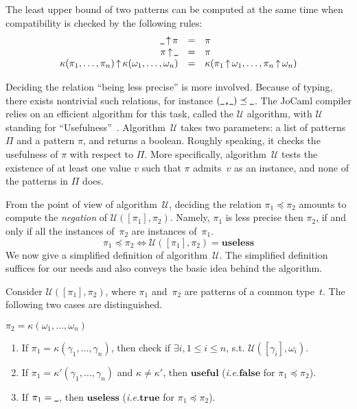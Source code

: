 \documentclass{LMCS}
\makeatletter
\newcommand{\pair}[2]{#1\mathord{\texttt{,}}#2}
\newcommand{\const}{\kappa}
\newcommand{\pt}{\pi}
\newcommand{\ptbis}{\omega}
\newcommand{\pts}{\Pi}
\newcommand{\lessprecise}{\preceq}
\newcommand{\ie}{\emph{i.e.}\@\xspace}
\newcommand{\jocaml}{\textrm{JoCaml}\xspace}
\newcommand{\kwd}[1]{\ensuremath{\mathbf{#1}}}
\newcommand{\lubop}{\mathop{\uparrow}}
\newcommand{\lub}[2]{#1 \lubop #2}
\renewcommand{\_}{\mathord{\rule[-.25ex]{1ex}{.15ex}}}
\makeatother
\begin{document}
The least upper bound of two patterns can be computed at the same time
when compatibility is checked by the following rules: $$
\begin{array}{rcllrcl}
\lub{\_}{\pt} & = & \pt \\
\lub{\pt}{\_} & = & \pt \\
\lub{\const(\pt_1,\ldots,\pt_n)}{\const(\ptbis_1,\ldots,\ptbis_n)} & = &
\const(\lub{\pt_1}{\ptbis_1}, \ldots, \lub{\pt_n}{\ptbis_n})
\end{array}
$$

Deciding the relation ``being less precise'' is more involved. Because
of typing, there exists nontrivial such relations, for instance
$(\pair{\_}{\_}) \lessprecise \_$.  The \jocaml compiler relies on an
efficient algorithm for this task, called the $\mathcal{U}$ algorithm,
with $\mathcal{U}$ standing for ``Usefulness''~\cite{warning}.
Algorithm~$\mathcal{U}$ takes two parameters: a list of patterns
$\pts$ and a pattern $\pt$, and returns a boolean. Roughly speaking, it
checks the usefulness of $\pt$ with respect to $\pts$. More
specifically, algorithm~$\mathcal{U}$ tests the existence of at least
one value $v$ such that $\pt$ admits~$v$ as an instance, and none of
the patterns in $\pts$ does.

From the point of view of algorithm~$\mathcal{U}$, deciding
the relation $\pt_1\lessprecise\pt_2$ amounts
to compute the \emph{negation} of $\mathcal{U}([\pt_1],\pt_2)$.
Namely, $\pt_1$ is less precise then $\pt_2$, if and only if
all the instances of~$\pt_2$ are instances of~$\pt_1$.
$$\pt_1\lessprecise\pt_2 \iff \mathcal{U}([\pt_1],\pt_2) = \kwd{useless}$$
We now give a simplified definition of algorithm~$\mathcal{U}$.
The simplified definition suffices for our needs and also conveys the
basic idea behind the algorithm.

Consider $\mathcal{U}([\pt_1],\pt_2)$, where
$\pt_1$ and~$\pt_2$ are patterns of a common type~$t$.
The following two cases are distinguished.\medskip

 $\pt_2 = \const(\ptbis_1,\ldots,\ptbis_n)$  \hfill
  \begin{enumerate}[$\bullet$]
  \item If $\pt_1 = \const(\gamma_1,\ldots,\gamma_n)$, then check if
    $\exists i, 1\leq i\leq n$, s.t.
    $\mathcal{U}([\gamma_i],\ptbis_i)$.
  \item If $\pt_1 = \const'(\gamma_1,\ldots,\gamma_n)$ and $\const
    \not= \const'$, then $\kwd{useful}$ (\ie $\kwd{false}$ for
    $\pt_1\lessprecise\pt_2$).
  \item If $\pt_1 = \_$, then $\kwd{useless}$ (\ie $\kwd{true}$ for
    $\pt_1\lessprecise\pt_2$).
  \end{enumerate}\medskip
\end{document}

